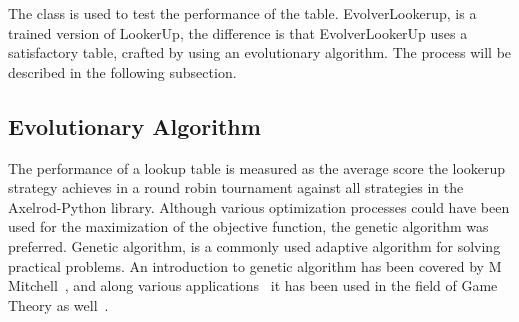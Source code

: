 
The class is used to test the performance of the table. EvolverLookerup, is a
trained version of LookerUp, the difference is that EvolverLookerUp uses a satisfactory
table, crafted by using an evolutionary algorithm. The process will be described
in the following subsection.

\subsection{Evolutionary Algorithm}
\label{sub:evolutionary-algorithm}
The performance of a lookup table is measured as the average score the lookerup
strategy achieves in a round robin tournament against all strategies in the
Axelrod-Python library. Although various optimization processes could have been
used for the maximization of the objective function,
the genetic algorithm was preferred. Genetic algorithm, is a commonly used adaptive
algorithm for solving practical problems. An introduction to genetic algorithm
has been covered by M Mitchell~\cite{Mitchell1998}, and along various applications~\cite{Chang1994}
it has been used in the field of Game Theory as well~\cite{Ismail2007}.


